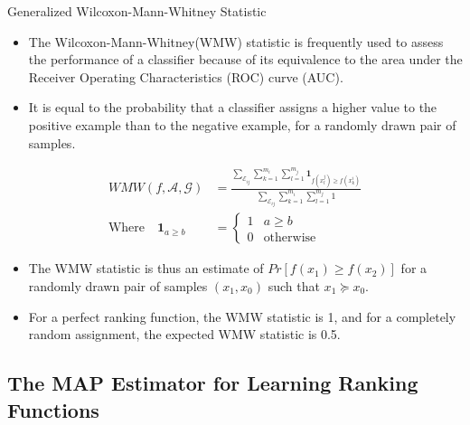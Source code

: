 \documentclass[8pt]{beamer}
\renewcommand{\|}[1][.3em]{\hspace{#1}|\hspace{#1}}
\renewcommand{\,}[1][.3em]{,\hspace{#1}}
\newlength{\wideitemsep}
\let\olditem\item
\renewcommand{\item}{\setlength{\itemsep}{\wideitemsep}\olditem}
\newcommand{\m}[1]{\mathcal{#1}}
\renewcommand{\,}{,\hspace{3pt}}
\renewcommand{\|}{\hspace{3pt}|\hspace{3pt}}
\begin{document}
\begin{frame}{Generalized Wilcoxon-Mann-Whitney Statistic}
    \begin{itemize}
    \item The Wilcoxon-Mann-Whitney(WMW) statistic is frequently used to assess the performance of a classifier because of its equivalence to the area under the Receiver Operating Characteristics (ROC) curve (AUC).
    \item  It is equal to the probability that a classifier assigns a higher value to the positive example than to the negative example, for a randomly
drawn pair of samples.
    \end{itemize}
    \begin{align}
    WMW(f, \m{A}, \m{G}) &= \frac{\sum_{\m{E}_{ij}}\sum_{k = 1}^{m_i}\sum_{l = 1}^{m_j} \textbf{1}_{f(x_l^j) \geq f(x_k^i)}}{\sum_{\m{E}_{ij}}\sum_{k = 1}^{m_i}\sum_{l = 1}^{m_j} 1}\label{eq:WMW_stat}\\
    \text{Where}\hspace{1em}\textbf{1}_{a \geq b} &= \begin{cases}
    1 & a \geq b\\
    0 & \text{otherwise}
    \end{cases}
    \end{align}
    \begin{itemize}
    \item The WMW statistic is thus an estimate of $Pr[f(x_1) \geq f(x_2)]$  for a randomly drawn pair of samples $(x_1, x_0)$ such that $x_1 \succeq x_0$.
    \item For a perfect ranking function, the WMW statistic is 1, and for a completely random assignment, the expected WMW statistic is 0.5.
    \end{itemize}
\end{frame}

\subsection{The MAP Estimator for Learning Ranking Functions}
\end{document}
